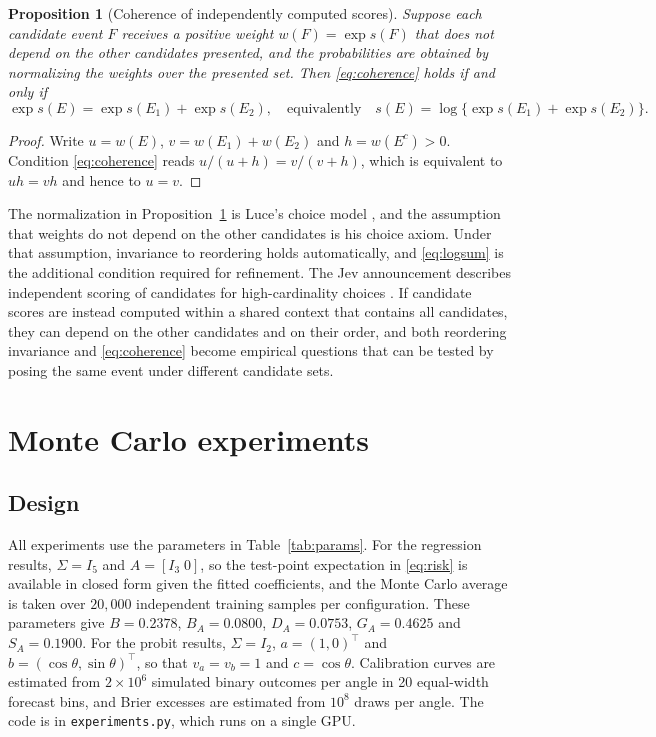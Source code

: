\documentclass[11pt]{article}
\newtheorem{proposition}[theorem]{Proposition}
\theoremstyle{remark}
\newcommand{\1}{\mathbf 1}
\begin{document}
\begin{proposition}[Coherence of independently computed scores]\label{prop:coherence}
Suppose each candidate event $F$ receives a positive weight $w(F)=\exp s(F)$ that does not depend on the other candidates presented, and the probabilities are obtained by normalizing the weights over the presented set. Then \eqref{eq:coherence} holds if and only if
\begin{equation}\label{eq:logsum}
\exp s(E)=\exp s(E_1)+\exp s(E_2),\quad\text{equivalently}\quad s(E)=\log\{\exp s(E_1)+\exp s(E_2)\}.
\end{equation}
\end{proposition}
\begin{proof}
Write $u=w(E)$, $v=w(E_1)+w(E_2)$ and $h=w(E^c)>0$. Condition \eqref{eq:coherence} reads $u/(u+h)=v/(v+h)$, which is equivalent to $uh=vh$ and hence to $u=v$.
\end{proof}

The normalization in Proposition~\ref{prop:coherence} is Luce's choice model \cite{luce}, and the assumption that weights do not depend on the other candidates is his choice axiom. Under that assumption, invariance to reordering holds automatically, and \eqref{eq:logsum} is the additional condition required for refinement. The Jev announcement describes independent scoring of candidates for high-cardinality choices \cite{typesafe}. If candidate scores are instead computed within a shared context that contains all candidates, they can depend on the other candidates and on their order, and both reordering invariance and \eqref{eq:coherence} become empirical questions that can be tested by posing the same event under different candidate sets.

\section{Monte Carlo experiments}\label{sec:mc}
\subsection{Design}
All experiments use the parameters in Table~\ref{tab:params}. For the regression results, $\Sigma=I_5$ and $A=[I_3\;0]$, so the test-point expectation in \eqref{eq:risk} is available in closed form given the fitted coefficients, and the Monte Carlo average is taken over $20{,}000$ independent training samples per configuration. These parameters give $B=0.2378$, $B_A=0.0800$, $D_A=0.0753$, $G_A=0.4625$ and $S_A=0.1900$. For the probit results, $\Sigma=I_2$, $a=(1,0)^\top$ and $b=(\cos\theta,\sin\theta)^\top$, so that $v_a=v_b=1$ and $c=\cos\theta$. Calibration curves are estimated from $2\times10^6$ simulated binary outcomes per angle in 20 equal-width forecast bins, and Brier excesses are estimated from $10^8$ draws per angle. The code is in \texttt{experiments.py}, which runs on a single GPU.
\end{document}
